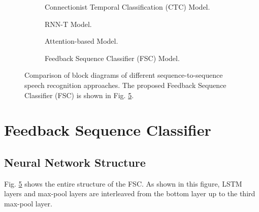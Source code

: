 \documentclass{article}
\begin{document}
\begin{figure}
  \centering
  \begin{subfigure}[b]{0.35\textwidth}
    \centering
    \resizebox{23mm}{!}{
      
    } 
    \caption {
      Connectionist Temporal Classification (CTC) Model.
      \label{fig:ctc_diagram}
    }
  \end{subfigure}
  \begin{subfigure}[b]{0.60\textwidth}
    \centering
    \resizebox{78mm}{!}{
      
    }
    \caption {
      RNN-T Model.
      \label{fig:rnn_t_diagram}
    }
  \end{subfigure}

  \begin{subfigure}[b]{0.55\textwidth}
    \centering
    \resizebox{53mm}{!}{
      
    }
    \caption {
      Attention-based Model.
      \label{fig:attention_diagram}
    }
  \end{subfigure}
  \begin{subfigure}[b]{0.3\textwidth}
    \centering
    \resizebox{26mm}{!}{
      
    }
    \caption {
      Feedback Sequence Classifier (FSC) Model.
      \label{fig:fsc_diagram}
    }
  \end{subfigure}
  \caption{
    Comparison of block diagrams of different sequence-to-sequence speech
    recognition approaches.
    The proposed Feedback Sequence Classifier (FSC) is shown in 
    Fig. \ref{fig:fsc_diagram}.
  }

\end{figure}




\section{Feedback Sequence Classifier}
\label{sec:feedback_sequence_classifier}


\subsection{Neural Network Structure}
\label{sec:neural_network_structure}
Fig. \ref{fig:fsc_diagram} shows the entire structure of the FSC. 
As shown in this figure, LSTM layers and max-pool layers
are interleaved from the bottom layer up to the third max-pool layer.
\end{document}
